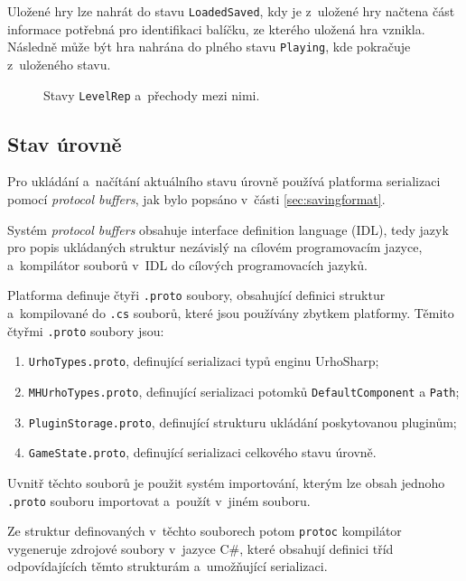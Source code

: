 Uložené hry lze nahrát do stavu \texttt{LoadedSaved}, kdy je z~uložené hry načtena část informace potřebná pro identifikaci balíčku, ze kterého uložená hra vznikla. Následně může být hra nahrána do plného stavu \texttt{Playing}, kde pokračuje z~uloženého stavu.

\begin{figure}[h]
	\centering
	\fontsize{8pt}{11pt}\selectfont
	\def\svgwidth{\textwidth}
	
	\caption{Stavy \texttt{LevelRep} a~přechody mezi nimi.}
	\label{fig:levelrepstates}
\end{figure}

\subsection{Stav úrovně}
Pro ukládání a~načítání aktuálního stavu úrovně používá platforma serializaci pomocí \textit{protocol buffers}, jak bylo popsáno v~části \ref{sec:savingformat}. 

Systém \textit{protocol buffers} obsahuje interface definition language (IDL), tedy jazyk pro popis ukládaných struktur nezávislý na cílovém programovacím jazyce, a~kompilátor souborů v~IDL do cílových programovacích jazyků. 

Platforma definuje čtyři \texttt{.proto} soubory, obsahující definici struktur a~kompilované do \texttt{.cs} souborů, které jsou používány zbytkem platformy. Těmito čtyřmi \texttt{.proto} soubory jsou:

\begin{enumerate}
	\item \texttt{UrhoTypes.proto}, definující serializaci typů enginu UrhoSharp;
	\item \texttt{MHUrhoTypes.proto}, definující serializaci potomků \texttt{DefaultComponent} a \texttt{Path};
	\item \texttt{PluginStorage.proto}, definující strukturu ukládání poskytovanou pluginům;
	\item \texttt{GameState.proto}, definující serializaci celkového stavu úrovně.
\end{enumerate}

Uvnitř těchto souborů je použit systém importování, kterým lze obsah jednoho \texttt{.proto} souboru importovat a~použít v~jiném souboru. 

Ze struktur definovaných v~těchto souborech potom \texttt{protoc} kompilátor vygeneruje zdrojové soubory v~jazyce C\#, které obsahují definici tříd odpovídajících těmto strukturám a~umožňující serializaci.

